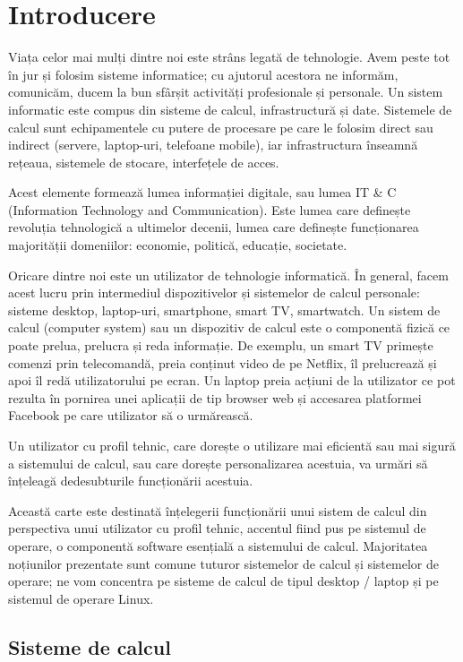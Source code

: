\chapter{Introducere}
\label{chapter:intro}

Viața celor mai mulți dintre noi este strâns legată de tehnologie. Avem peste tot în jur și folosim sisteme informatice; cu ajutorul acestora ne informăm, comunicăm, ducem la bun sfârșit activități profesionale și personale. Un sistem informatic este compus din sisteme de calcul, infrastructură și date. Sistemele de calcul sunt echipamentele cu putere de procesare pe care le folosim direct sau indirect (servere, laptop-uri, telefoane mobile), iar infrastructura înseamnă rețeaua, sistemele de stocare, interfețele de acces.

Acest elemente formează lumea informației digitale, sau lumea IT & C (Information Technology and Communication). Este lumea care definește revoluția tehnologică a ultimelor decenii, lumea care definește funcționarea majorității domeniilor: economie, politică, educație, societate.

Oricare dintre noi este un utilizator de tehnologie informatică. În general, facem acest lucru prin intermediul dispozitivelor și sistemelor de calcul personale: sisteme desktop, laptop-uri, smartphone, smart TV, smartwatch. Un sistem de calcul (computer system) sau un dispozitiv de calcul este o componentă fizică ce poate prelua, prelucra și reda informație. De exemplu, un smart TV primește comenzi prin telecomandă, preia conținut video de pe Netflix, îl prelucrează și apoi îl redă utilizatorului pe ecran. Un laptop preia acțiuni de la utilizator ce pot rezulta în pornirea unei aplicații de tip browser web și accesarea platformei Facebook pe care utilizator să o urmărească.

Un utilizator cu profil tehnic, care dorește o utilizare mai eficientă sau mai sigură a sistemului de calcul, sau care dorește personalizarea acestuia, va urmări să înțeleagă dedesubturile funcționării acestuia.

Această carte este destinată înțelegerii funcționării unui sistem de calcul din perspectiva unui utilizator cu profil tehnic, accentul fiind pus pe sistemul de operare, o componentă software esențială a sistemului de calcul. Majoritatea noțiunilor prezentate sunt comune tuturor sistemelor de calcul și sistemelor de operare; ne vom concentra pe sisteme de calcul de tipul desktop / laptop și pe sistemul de operare Linux.

\section{Sisteme de calcul}
\label{sec:intro:computing-systems}

